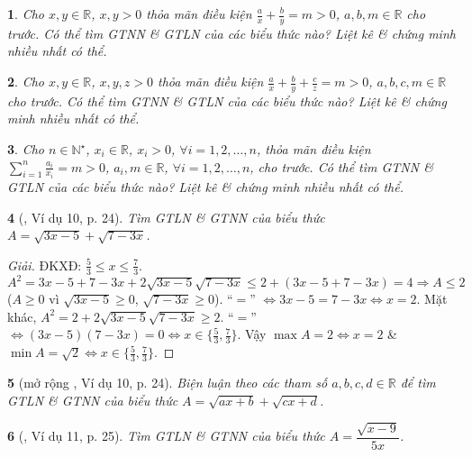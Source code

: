 \documentclass{article}
\newtheorem{baitoan}{}
\begin{document}
\begin{baitoan}
	Cho $x,y\in\mathbb{R}$, $x,y > 0$ thỏa mãn điều kiện $\frac{a}{x} + \frac{b}{y} = m > 0$, $a,b,m\in\mathbb{R}$ cho trước. Có thể tìm {\rm GTNN} \& {\rm GTLN} của các biểu thức nào? Liệt kê \& chứng minh nhiều nhất có thể.
\end{baitoan}

\begin{baitoan}
	Cho $x,y\in\mathbb{R}$, $x,y,z > 0$ thỏa mãn điều kiện $\frac{a}{x} + \frac{b}{y} + \frac{c}{z} = m > 0$, $a,b,c,m\in\mathbb{R}$ cho trước. Có thể tìm {\rm GTNN} \& {\rm GTLN} của các biểu thức nào? Liệt kê \& chứng minh nhiều nhất có thể.
\end{baitoan}

\begin{baitoan}
	Cho $n\in\mathbb{N}^\star$, $x_i\in\mathbb{R}$, $x_i > 0$, $\forall i = 1,2,\ldots,n$, thỏa mãn điều kiện $\sum_{i=1}^n \frac{a_i}{x_i} = m > 0$, $a_i,m\in\mathbb{R}$, $\forall i = 1,2,\ldots,n$, cho trước. Có thể tìm {\rm GTNN} \& {\rm GTLN} của các biểu thức nào? Liệt kê \& chứng minh nhiều nhất có thể.
\end{baitoan}

\begin{baitoan}[\cite{Tuyen_Toan_9_old}, Ví dụ 10, p. 24]
	Tìm {\rm GTLN} \& {\rm GTNN} của biểu thức $A = \sqrt{3x - 5} + \sqrt{7 - 3x}$.
\end{baitoan}

\begin{proof}[Giải]
	ĐKXĐ: $\frac{5}{3}\le x\le\frac{7}{3}$. $A^2 = 3x - 5 + 7 - 3x + 2\sqrt{3x - 5}\sqrt{7 - 3x}\le2 + (3x - 5 + 7 - 3x) = 4\Rightarrow A\le2$ ($A\ge0$ vì $\sqrt{3x - 5}\ge0$, $\sqrt{7 - 3x}\ge0$). ``$=$'' $\Leftrightarrow 3x - 5 = 7 - 3x\Leftrightarrow x = 2$. Mặt khác, $A^2 = 2 + 2\sqrt{3x - 5}\sqrt{7 - 3x}\ge2$. ``$=$'' $\Leftrightarrow(3x - 5)(7 - 3x) = 0\Leftrightarrow x\in\{\frac{5}{3},\frac{7}{3}\}$. Vậy $\max A = 2\Leftrightarrow x = 2$ \& $\min A = \sqrt{2}\Leftrightarrow x\in\{\frac{5}{3},\frac{7}{3}\}$.
\end{proof}

\begin{baitoan}[mở rộng \cite{Tuyen_Toan_9_old}, Ví dụ 10, p. 24]
	Biện luận theo các tham số $a,b,c,d\in\mathbb{R}$ để tìm {\rm GTLN} \& {\rm GTNN} của biểu thức $A = \sqrt{ax + b} + \sqrt{cx + d}$.
\end{baitoan}

\begin{baitoan}[\cite{Tuyen_Toan_9_old}, Ví dụ 11, p. 25]
	Tìm {\rm GTLN} \& {\rm GTNN} của biểu thức $A = \dfrac{\sqrt{x - 9}}{5x}$.
\end{baitoan}
\end{document}
